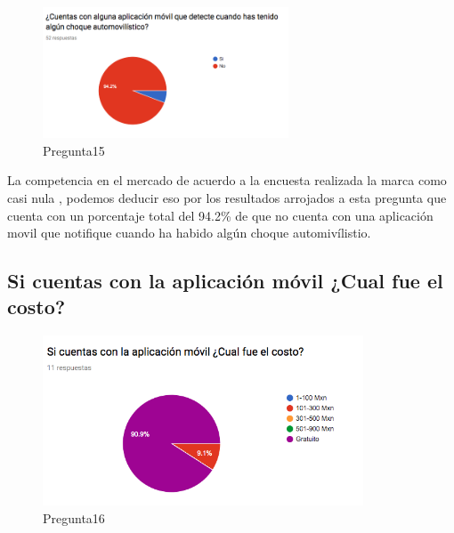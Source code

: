\begin{figure}[htbp!]
	\begin{center}
		\includegraphics[width=0.65\textwidth]{DisenoEstructura/imagenes/Pregunta15}
		\caption{Pregunta15}
		\label{DE/FO/Pregunta15}
	\end{center}
\end{figure}

La competencia en el mercado de acuerdo a la encuesta realizada la marca como casi nula , podemos deducir eso por los resultados arrojados a esta pregunta que cuenta con un porcentaje total del 94.2\% de que no cuenta con una aplicación movil que notifique cuando ha habido algún choque automivílistio.\\

\subsection{Si cuentas con la aplicación móvil ¿Cual fue el costo?}

\begin{figure}[htbp!]
	\begin{center}
		\includegraphics[width=0.85\textwidth]{DisenoEstructura/imagenes/Pregunta16}
		\caption{Pregunta16}
		\label{DE/FO/Pregunta16}
	\end{center}
\end{figure}

